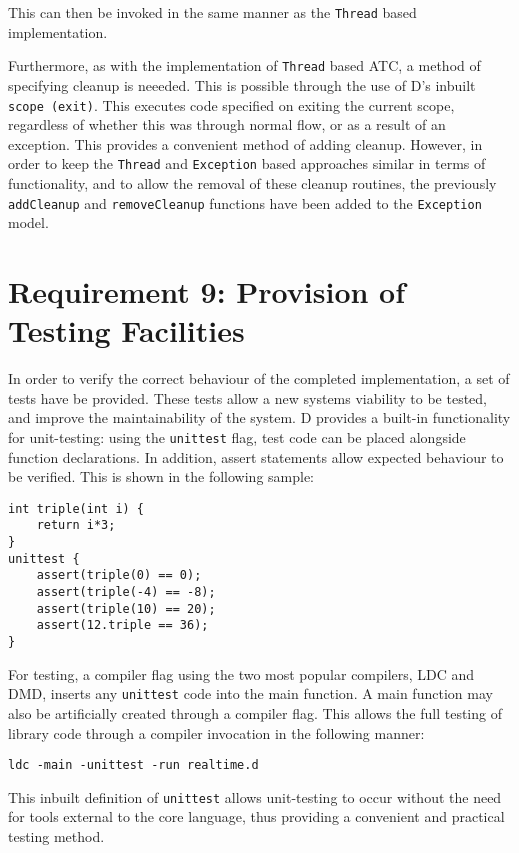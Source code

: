 This can then be invoked in the same manner as the \texttt{Thread} based
implementation.
\par\bigskip\noindent
Furthermore, as with the implementation of \texttt{Thread} based ATC, a method 
of specifying cleanup is neeeded. This
is possible through the use of D's inbuilt \texttt{scope (exit)}.
This executes code specified on exiting the current scope, regardless of
whether this was through normal flow, or as a result of an exception. 
This provides a convenient method of adding cleanup. 
However, in order to keep the \texttt{Thread} and
\texttt{Exception} based approaches similar in terms of functionality, and to
allow the removal of these cleanup routines, the 
previously \texttt{addCleanup} and \texttt{removeCleanup} functions have
been added to the \texttt{Exception} model. 
\par\bigskip\noindent

\section{Requirement 9: Provision of Testing Facilities}
In order to verify the correct behaviour of the completed implementation, a set 
of tests have be provided. These tests allow a new systems viability 
to be tested, and improve the maintainability of the system. D provides a built-in 
functionality for unit-testing: using the \texttt{unittest} flag, test code can 
be placed alongside function declarations. In addition, assert statements allow 
expected behaviour to be verified. 
This is shown in the following sample:
\begin{lstlisting}
int triple(int i) {
    return i*3; 
}
unittest {
    assert(triple(0) == 0); 
    assert(triple(-4) == -8); 
    assert(triple(10) == 20); 
    assert(12.triple == 36);
}
\end{lstlisting}
For testing, a compiler flag using the two most popular compilers, LDC and DMD, 
inserts any \texttt{unittest} code into the main function. A main function may 
also be artificially created through a compiler flag. This allows the 
full testing of library code through a compiler invocation in the following manner: 
\begin{lstlisting}
ldc -main -unittest -run realtime.d
\end{lstlisting}
This inbuilt definition of \texttt{unittest} allows unit-testing to occur 
without the need for tools external to the core language, thus providing a convenient 
and practical testing method. 
